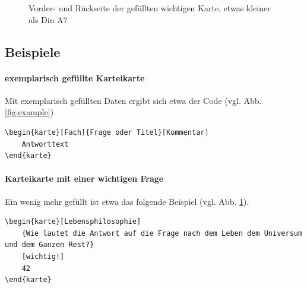 \documentclass[a4paper]{article}
\begin{document}
\begin{figure}
	\quad	{}
	\caption{Vorder- und Rückseite der gefüllten wichtigen Karte, etwas kleiner als Din A7}\label{fig:completeexample}
\end{figure}

\subsection{Beispiele}
\paragraph{exemplarisch gefüllte Karteikarte}
Mit exemplarisch gefüllten Daten ergibt sich etwa der Code (vgl. Abb. \ref{fig:example})
	\begin{lstlisting}
\begin{karte}[Fach]{Frage oder Titel}[Kommentar]
	Antworttext
\end{karte}
	\end{lstlisting} 

\paragraph{Karteikarte mit einer wichtigen Frage}
	Ein wenig mehr gefüllt ist etwa das folgende Beispiel (vgl. Abb. \ref{fig:completeexample}).
	\begin{lstlisting}
\begin{karte}[Lebensphilosophie]
	{Wie lautet die Antwort auf die Frage nach dem Leben dem Universum und dem Ganzen Rest?}
	[wichtig!]
	42
\end{karte}		
	\end{lstlisting}	
\end{document}
